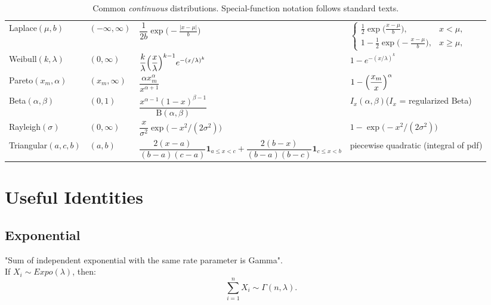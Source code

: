 \documentclass{article}
\begin{document}
\begin{table}[ht]
\begin{tabular}{@{}l l l l@{}}
Laplace$(\mu,b)$          & $(-\infty,\infty)$ &
$ \dfrac{1}{2b}\exp\!\bigl(-\tfrac{|x-\mu|}{b}\bigr)$ &
$ \begin{cases}
  \tfrac12\exp\!\bigl(\tfrac{x-\mu}{b}\bigr), & x<\mu,\\[3pt]
  1-\tfrac12\exp\!\bigl(-\tfrac{x-\mu}{b}\bigr), & x\ge\mu,
  \end{cases}$ \\[12pt]

Weibull$(k,\lambda)$      & $(0,\infty)$ &
$ \dfrac{k}{\lambda}\Bigl(\dfrac{x}{\lambda}\Bigr)^{k-1}
  e^{-(x/\lambda)^{k}}$ &
$ 1-e^{-(x/\lambda)^{k}}$ \\[9pt]

Pareto$(x_{m},\alpha)$    & $(x_{m},\infty)$ &
$ \dfrac{\alpha x_{m}^{\alpha}}{x^{\alpha+1}}$ &
$ 1-\Bigl(\dfrac{x_{m}}{x}\Bigr)^{\alpha}$ \\[9pt]

Beta$(\alpha,\beta)$      & $(0,1)$ &
$ \dfrac{x^{\alpha-1}(1-x)^{\beta-1}}{\mathrm B(\alpha,\beta)}$ &
$ I_{x}(\alpha,\beta)$\quad($I_{x}$ = regularized Beta) \\[9pt]

Rayleigh$(\sigma)$        & $(0,\infty)$ &
$ \dfrac{x}{\sigma^{2}} \exp\!\bigl(-x^{2}/(2\sigma^{2})\bigr)$ &
$ 1-\exp\!\bigl(-x^{2}/(2\sigma^{2})\bigr)$ \\[6pt]

Triangular$(a,c,b)$       & $(a,b)$ &
$ \dfrac{2(x-a)}{(b-a)(c-a)}\mathbf 1_{a\le x<c}
 +\dfrac{2(b-x)}{(b-a)(b-c)}\mathbf 1_{c\le x<b}$ &
piecewise quadratic (integral of pdf) \\[6pt]
\bottomrule
\end{tabular}
\caption{Common \emph{continuous} distributions.  Special-function notation follows standard texts.}
\end{table}
\section{Useful Identities}
\subsection{Exponential}
"Sum of independent exponential with the same rate parameter is Gamma".\\
If $X_i \sim Expo(\lambda)$, then:
$$\sum_{i=1}^n X_i \sim \Gamma (n, \lambda).$$
\end{document}
